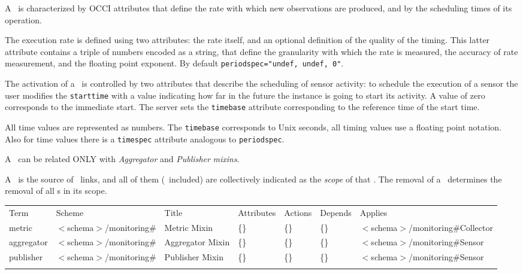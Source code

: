 \documentclass[10pt,a4paper]{article}
\begin{document}
A \sens\ is characterized by OCCI attributes that define the rate with which new observations are produced, and by the scheduling times of its operation.

The execution rate is defined using two attributes: the rate itself, and an optional definition of the quality of the timing. This latter attribute contains a triple of numbers encoded as a string, that define the granularity with which the rate is measured, the accuracy of rate measurement, and the floating point exponent. By default \verb|periodspec="undef, undef, 0"|.

The activation of a \sens\ is controlled by two attributes that describe the scheduling of sensor activity: to schedule the execution of a sensor the user modifies the {\tt starttime} with a value indicating how far in the future the instance is going to start its activity. A value of zero corresponds to the immediate start. The server sets the {\tt timebase} attribute corresponding to the reference time of the start time.

All time values are represented as numbers. The {\tt timebase} corresponds to Unix seconds, all timing values use a floating point notation. Also for time values there is a {\tt timespec} attribute analogous to {\tt periodspec}.

A \sens\ can be related ONLY with {\em Aggregator} and {\em Publisher} {\em mixins}.

A \sens\ is the source of \coll\ links, and all of them (\sens\ included) are collectively indicated as the {\em scope} of that \sens . The removal of a \sens\ determines the removal of all \coll s in its scope. 

 {
        \begin{tabular}{lllllll}
        \toprule
        Term & Scheme & Title & Attributes & Actions & Depends & Applies \\
        \colrule
        metric &  $<$schema$>$/monitoring\# & Metric Mixin 
        & \{\} & \{\} & \{\} & $<$schema$>$/monitoring\#Collector \\
        aggregator &  $<$schema$>$/monitoring\# & Aggregator Mixin 
        & \{\} & \{\} & \{\} & $<$schema$>$/monitoring\#Sensor \\
        publisher &  $<$schema$>$/monitoring\# & Publisher Mixin 
        & \{\} & \{\} & \{\} & $<$schema$>$/monitoring\#Sensor \\
        \botrule
        \end{tabular}
}
 
\end{document}

